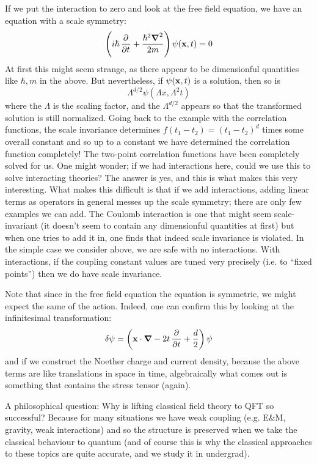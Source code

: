 If we put the interaction to zero and look at the free field equation, we have an equation with a scale symmetry:
\begin{equation}
    \left(i\hbar \dpd{}{t} + \frac{\hbar^2\nabla^2}{2m}\right)\psi(\v{x}, t) = 0
\end{equation}
At first this might seem strange, as there appear to be dimensionful quantities like $\hbar, m$ in the above. But nevertheless, if $\psi(\mathbf{x}, t)$ is a solution, then so is
\begin{equation}
    \Lambda^{d/2} \psi(\Lambda x, \Lambda^2 t)
\end{equation}
where the $\Lambda$ is the scaling factor, and the $\Lambda^{d/2}$ appears so that the transformed solution is still normalized. Going back to the example with the correlation functions, the scale invariance determines $f(t_1 - t_2) = (t_1 - t_2)^d$ times some overall constant and so up to a constant we have determined the correlation function completely! The two-point correlation functions have been completely solved for us. One might wonder; if we had interactions here, could we use this to solve interacting theories? The answer is yes, and this is what makes this very interesting. What makes this difficult is that if we add interactions, adding linear terms as operators in general messes up the scale symmetry; there are only few examples we can add. The Coulomb interaction is one that might seem scale-invariant (it doesn't seem to contain any dimensionful quantities at first) but when one tries to add it in, one finds that indeed scale invariance is violated. In the simple case we consider above, we are safe with no interactions. With interactions, if the coupling constant values are tuned very precisely (i.e. to ``fixed points'') then we do have scale invariance.

Note that since in the free field equation the equation is symmetric, we might expect the same of the action. Indeed, one can confirm this by looking at the infinitesimal transformation:
\begin{equation}
    \delta \psi = \left(\v{x} \cdot \nabla - 2t\dpd{}{t} + \frac{d}{2}\right)\psi
\end{equation}
and if we construct the Noether charge and current density, because the above terms are like translations in space in time, algebraically what comes out is something that contains the stress tensor (again). 

A philosophical question: Why is lifting classical field theory to QFT so successful? Because for many situations we have weak coupling (e.g. E\&M, gravity, weak interactions) and so the structure is preserved when we take the classical behaviour to quantum (and of course this is why the classical approaches to these topics are quite accurate, and we study it in undergrad).